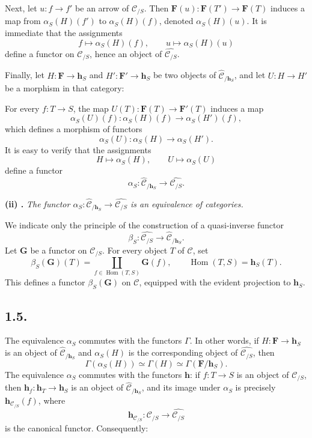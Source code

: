 Next, let \(u:f\to f'\) be an arrow of \(\mathscr C_{/S}\). Then
\(\mathbf F(u):\mathbf F(T')\to\mathbf F(T)\) induces a map from
\(\alpha_S(H)(f')\) to \(\alpha_S(H)(f)\), denoted \(\alpha_S(H)(u)\). It
is immediate that the assignments
\[
  f\longmapsto\alpha_S(H)(f),
  \qquad
  u\longmapsto\alpha_S(H)(u)
\]
define a functor on \(\mathscr C_{/S}\), hence an object of
\(\widehat{\mathscr C_{/S}}\).

Finally, let \(H:\mathbf F\to\mathbf h_S\) and
\(H':\mathbf F'\to\mathbf h_S\) be two objects of
\(\widehat{\mathscr C}_{/\mathbf h_S}\), and let \(U:H\to H'\) be a
morphism in that category:

\begin{center}
  
\end{center}

For every \(f:T\to S\), the map
\(U(T):\mathbf F(T)\to\mathbf F'(T)\) induces a map
\[
  \alpha_S(U)(f):\alpha_S(H)(f)
    \longrightarrow\alpha_S(H')(f),
\]
which defines a morphism of functors
\[
  \alpha_S(U):\alpha_S(H)\longrightarrow\alpha_S(H').
\]
It is easy to verify that the assignments
\[
  H\longmapsto\alpha_S(H),
  \qquad
  U\longmapsto\alpha_S(U)
\]
define a functor
\[
  \alpha_S:\widehat{\mathscr C}_{/\mathbf h_S}
    \longrightarrow\widehat{\mathscr C_{/S}}.
\]

\medskip
{}
\noindent\textbf{(ii) .}
\textit{The functor
\(\alpha_S:\widehat{\mathscr C}_{/\mathbf h_S}
\to\widehat{\mathscr C_{/S}}\) is an equivalence of categories.}

We indicate only the principle of the construction of a quasi-inverse functor
\[
  \beta_S:\widehat{\mathscr C_{/S}}
    \longrightarrow\widehat{\mathscr C}_{/\mathbf h_S}.
\]
Let \(\mathbf G\) be a functor on \(\mathscr C_{/S}\). For every object
\(T\) of \(\mathscr C\), set
\[
  \beta_S(\mathbf G)(T)
    =\coprod_{f\in\operatorname{Hom}(T,S)}\mathbf G(f),
  \qquad \operatorname{Hom}(T,S)=\mathbf h_S(T).
\]
This defines a functor \(\beta_S(\mathbf G)\) on \(\mathscr C\), equipped
with the evident projection to \(\mathbf h_S\).

\subsection*{1.5.}

The equivalence \(\alpha_S\) commutes with the functors \(\Gamma\). In other
words, if \(H:\mathbf F\to\mathbf h_S\) is an object of
\(\widehat{\mathscr C}_{/\mathbf h_S}\) and \(\alpha_S(H)\) is the
corresponding object of \(\widehat{\mathscr C_{/S}}\), then
\[
  \Gamma(\alpha_S(H))
    \simeq\Gamma(H)
    \simeq\Gamma(\mathbf F/\mathbf h_S).
\]
The equivalence \(\alpha_S\) commutes with the functors \(\mathbf h\):
if \(f:T\to S\) is an object of \(\mathscr C_{/S}\), then
\(\mathbf h_f:\mathbf h_T\to\mathbf h_S\) is an object of
\(\widehat{\mathscr C}_{/\mathbf h_S}\), and its image under \(\alpha_S\)
is precisely \(\mathbf h_{\mathscr C_{/S}}(f)\), where
\[
  \mathbf h_{\mathscr C_{/S}}:
    \mathscr C_{/S}\longrightarrow\widehat{\mathscr C_{/S}}
\]
is the canonical functor.
Consequently:

